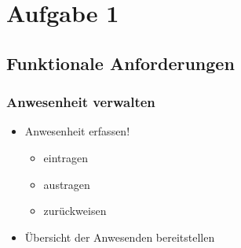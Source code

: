 \newcommand{\customDir}{}




\setCustomSignature{\footnotesize{\textcolor{darkgray}{von Luga, Pour, \\Retsch, Strube}}}	%
\setCustomTitleAuthor{\textcolor{darkgray}{\customAuthor}}	%




%



\maketitle
\newpage
\tableofcontents
\newpage

\chapter{Aufgabe 1}
\section{Funktionale Anforderungen}
\subsection*{Anwesenheit verwalten}
\begin{itemize}
\item Anwesenheit erfassen!
\begin{itemize}
\item eintragen
\item austragen 
\item zurückweisen
\end{itemize}
\item Übersicht der Anwesenden bereitstellen
\end{itemize}
